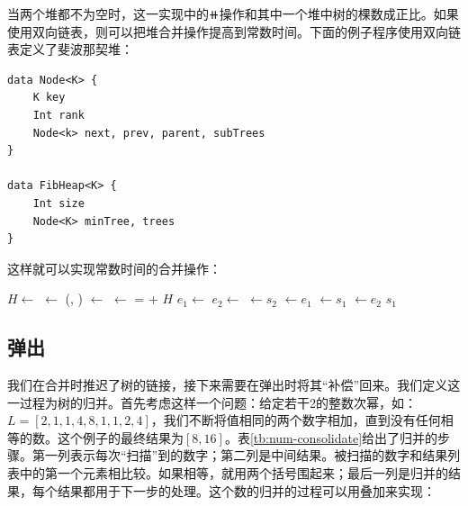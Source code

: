 \documentclass[b5paper]{ctexart}
\begin{document}
当两个堆都不为空时，这一实现中的$\doubleplus$操作和其中一个堆中树的棵数成正比。如果使用双向链表，则可以把堆合并操作提高到常数时间。下面的例子程序使用双向链表定义了斐波那契堆：

\begin{lstlisting}[language = Bourbaki]
data Node<K> {
    K key
    Int rank
    Node<k> next, prev, parent, subTrees
}

data FibHeap<K> {
    Int size
    Node<K> minTree, trees
}
\end{lstlisting}

这样就可以实现常数时间的合并操作：

\begin{algorithmic}[1]
  \State $H \gets$ 
  \State {} $\gets$ (, )
    \State {} $\gets$ 
  \Else
    \State {} $\gets$ 
  \EndIf
   =  + 
  \State \Return $H$
\EndFunction
\Statex
{}
  \State $e_1 \gets$ 
  \State $e_2 \gets$ 
  \State {} $\gets s_2$
  \State {} $\gets e_1$
  \State {} $\gets s_1$
  \State {} $\gets e_2$
  \State \Return $s_1$
\EndFunction
\end{algorithmic}

\subsection{弹出}
 

我们在合并时推迟了树的链接，接下来需要在弹出时将其“补偿”回来。我们定义这一过程为树的归并。首先考虑这样一个问题：给定若干2的整数次幂，如：$L = [2, 1, 1, 4, 8, 1, 1, 2, 4]$，我们不断将值相同的两个数字相加，直到没有任何相等的数。这个例子的最终结果为$[8, 16]$。表\ref{tb:num-consolidate}给出了归并的步骤。第一列表示每次“扫描”到的数字；第二列是中间结果。被扫描的数字和结果列表中的第一个元素相比较。如果相等，就用两个括号围起来；最后一列是归并的结果，每个结果都用于下一步的处理。这个数的归并的过程可以用叠加来实现：
\end{document}
